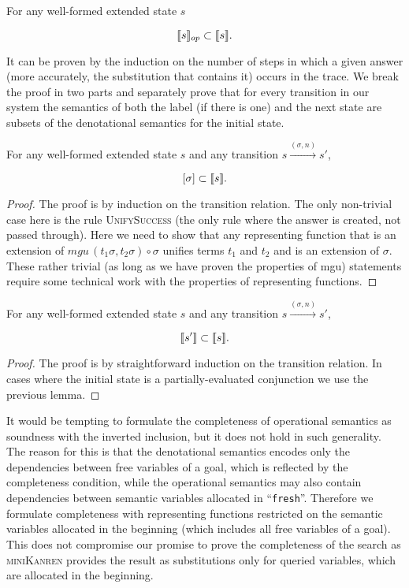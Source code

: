 \begin{lemma}
\label{GenSoundnessLemma}
For any well-formed extended state $s$

\[
\llbracket{s}\rrbracket_{op} \subset \llbracket{s}\rrbracket.
\]
\end{lemma}

It can be proven by the induction on the number of steps in which a given answer (more accurately, the substitution that contains it) occurs in the trace.
We break the proof in two parts and separately prove that for every transition in our system the semantics of both the label (if there is one)
and the next state are subsets of the denotational semantics for the initial state.

\begin{lemma}
\label{AnswerSoundnessLemma}
For any well-formed extended state $s$ and any transition $s \xrightarrow{(\sigma, n)} s'$,

\[
[\sigma] \subset \llbracket{s}\rrbracket.
\]
\end{lemma}
\begin{proof}
  The proof is by induction on the transition relation. The only non-trivial case here is the rule \textsc{UnifySuccess} (the only rule where the answer is created, not passed through).
  Here we need to show that any representing function that is an extension of $mgu\,(t_1 \sigma, t_2 \sigma) \circ \sigma$ unifies terms $t_1$ and $t_2$ and is an extension of $\sigma$.
  These rather trivial (as long as we have proven the properties of mgu) statements require some technical work with the properties of representing functions.
\end{proof}

\begin{lemma}
\label{NextStateSoundnessLemma}
For any well-formed extended state $s$ and any transition $s \xrightarrow{(\sigma, n)} s'$,

\[
\llbracket{s'}\rrbracket \subset \llbracket{s}\rrbracket.
\]
\end{lemma}
\begin{proof}
The proof is by straightforward induction on the transition relation. In cases where the initial state is a partially-evaluated conjunction we use the previous lemma.
\end{proof}

It would be tempting to formulate the completeness of operational semantics as soundness with the inverted inclusion, but it does not hold in such generality.
The reason for this is that the denotational semantics encodes only the dependencies between free variables of a goal, which is reflected by the completeness condition,
while the operational semantics may also contain dependencies between semantic variables allocated in ``\lstinline|fresh|''. Therefore we formulate completeness
with representing functions restricted on the semantic variables allocated in the beginning (which includes all free variables of a goal). This does not
compromise our promise to prove the completeness of the search as \textsc{miniKanren} provides the result as substitutions only for queried variables,
which are allocated in the beginning.


